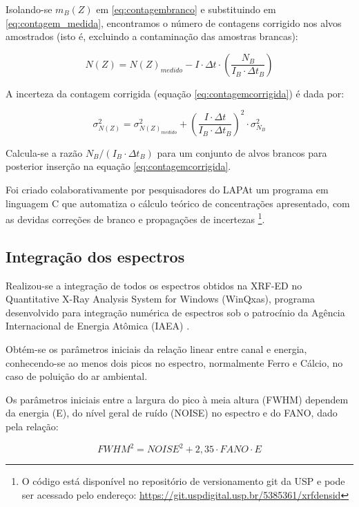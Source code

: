 Isolando-se $m_B(Z)$ em \ref{eq:contagembranco} e substituindo em 
\ref{eq:contagem_medida}, encontramos o número de contagens corrigido nos alvos amostrados
(isto é, excluindo a contaminação das amostras brancas):
 
\begin{equation}
  \label{eq:contagemcorrigida}
  N(Z) = N(Z)_{medido} - I \cdot \Delta t \cdot \left( \frac{N_B}{I_B \cdot \Delta t_B}  \right)
\end{equation}

A incerteza da contagem corrigida (equação \ref{eq:contagemcorrigida}) é dada por:

\begin{equation}
  \label{eq:erro_contagemcorrigida}
  \sigma_{N(Z)}^2 = \sigma_{N(Z)_{medido}}^2 + \left( \frac{I \cdot \Delta t}{I_B \cdot \Delta t_B} \right)^2 \cdot \sigma_{N_B}^2
\end{equation}

Calcula-se a razão $N_B/(I_B \cdot \Delta t_B)$ para um conjunto de alvos brancos para 
posterior inserção na equação \ref{eq:contagemcorrigida}.

Foi criado colaborativamente por pesquisadores do LAPAt um programa 
em linguagem C que automatiza o cálculo teórico de concentrações apresentado, 
com as devidas correções de branco e propagações de incertezas \footnote{
O código está disponível no repositório de versionamento git da USP 
e pode ser acessado pelo endereço: 
\url{https://git.uspdigital.usp.br/5385361/xrfdensid}}.

\subsection{Integração dos espectros}

Realizou-se a integração de todos os espectros obtidos na XRF-ED no
Quantitative X-Ray Analysis System for Windows (WinQxas),
programa desenvolvido para integração numérica de espectros sob o patrocínio 
da Agência Internacional de Energia Atômica (IAEA) \citep{capote2000}.

Obtém-se os parâmetros iniciais da relação linear entre canal e energia,
conhecendo-se ao menos dois picos no espectro, normalmente Ferro e Cálcio, 
no caso de poluição do ar ambiental. 

Os parâmetros iniciais entre a largura do pico à meia altura (FWHM)
dependem da energia (E), do nível geral de ruído (NOISE) no espectro 
e do FANO, dado pela relação: 

\begin{equation}
  \label{eq:fwhm}
   {FWHM}^2 = {NOISE}^2 + 2,35 \cdot FANO  \cdot E
\end{equation}

